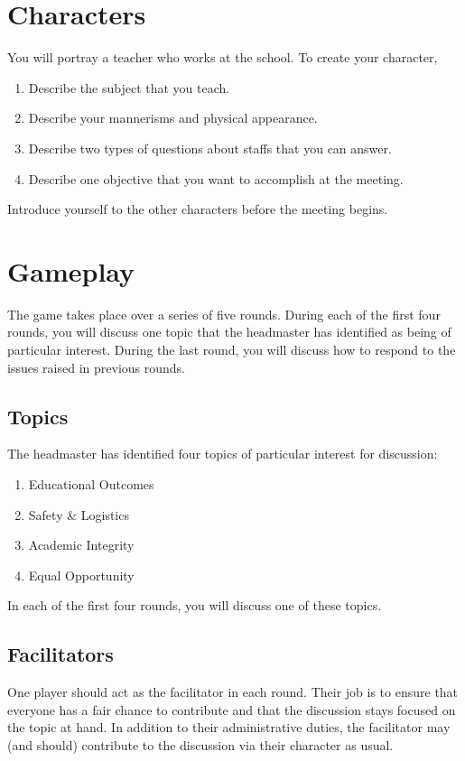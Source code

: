 \documentclass[a6paper, 11pt, parskip=half]{scrartcl}
\begin{document}
\section*{Characters}
You will portray a teacher who works at the school. To create your character,
\begin{enumerate}[nosep]
	\item Describe the subject that you teach.
	\item Describe your mannerisms and physical appearance.
	\item Describe two types of questions about staffs that you can answer.
	\item Describe one objective that you want to accomplish at the meeting.
\end{enumerate}
Introduce yourself to the other characters before the meeting begins.%

\section*{Gameplay}
The game takes place over a series of five rounds. 
During each of the first four rounds, you will discuss one topic that the headmaster has identified as being of particular interest.
During the last round, you will discuss how to respond to the issues raised in previous rounds. 

\newpage
\enlargethispage{3.5\baselineskip}

\subsection*{Topics}
The headmaster has identified four topics of particular interest for discussion:
\begin{enumerate}[nosep]
	\item Educational Outcomes
	\item Safety \& Logistics
	\item Academic Integrity
	\item Equal Opportunity
\end{enumerate}
In each of the first four rounds, you will discuss one of these topics.

\subsection*{Facilitators}
One player should act as the facilitator in each round. Their job is to ensure that everyone has a fair chance to contribute and that the discussion stays focused on the topic at hand. In addition to their administrative duties, the facilitator may (and should) contribute to the discussion via their character as usual. 
\end{document}
